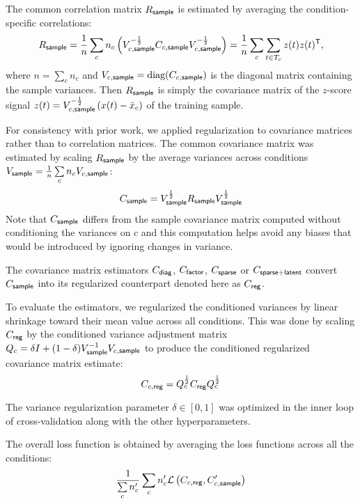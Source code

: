 The common correlation matrix $R_{\sf sample}$ is estimated by averaging the condition-specific correlations:
\begin{equation}
    R_{\sf sample}  
    = \frac 1 n \sum\limits_c n_c \left(V_{c,\sf sample}^{-\frac 1 2}C_{c,\sf sample}V_{c,\sf sample}^{-\frac 1 2}\right)
    = \frac 1 n \sum\limits_c \sum\limits_{t \in T_c} z(t)z(t)^{\sf T},
\end{equation}
where $n=\sum\limits_c n_c$ and $V_{c,\sf sample} = \mbox{diag}(C_{c,\sf sample})$ is the diagonal matrix containing the sample variances. Then $R_{\sf sample}$ is simply the covariance matrix of the $z$-score signal $z(t) = V_{c,\sf sample}^{-\frac 1 2} \left(x(t) - \bar x_c\right)$ of the training sample.

For consistency with prior work, we applied regularization to covariance matrices rather than to correlation matrices. The common covariance matrix was estimated by scaling $R_{\sf sample}$ by the average variances across conditions $V_{\sf sample} = \frac 1 n \sum\limits_c n_c V_{c,\sf sample}$:
\begin{equation}
    C_{\sf sample} = V_{\sf sample}^{\frac 1 2} R_{\sf sample} V_{\sf sample}^{\frac 1 2}
\end{equation}
Note that $C_{\sf sample}$ differs from the sample covariance matrix computed without conditioning the variances on $c$ and this computation helps avoid any biases that would be introduced by ignoring changes in variance.

The covariance matrix estimators $C_{\sf diag}$, $C_{\sf factor}$, $C_{\sf sparse}$ or $C_{\sf sparse+latent}$ convert $C_{\sf sample}$ into its regularized counterpart denoted here as $C_{\sf reg}$.

To evaluate the estimators, we regularized the conditioned variances by linear shrinkage toward their mean value across all conditions. This was done by scaling $C_{\sf reg}$ by the conditioned variance adjustment matrix $Q_c = \delta I + (1-\delta)V_{\sf sample}^{-1} V_{c,\sf sample}$ to produce the conditioned regularized covariance matrix estimate:
\begin{equation}
    C_{c,\sf reg} = Q_c^{\frac 1 2} C_{\sf reg} Q_c^{\frac 1 2}
\end{equation}

The variance regularization parameter $\delta \in [0,1]$ was optimized in the inner loop of cross-validation along with the other hyperparameters.

The overall loss function is obtained by averaging the loss functions across all the conditions:
\begin{equation}\label{eq:full-loss}
    \frac 1 {\sum\limits_c n_c^\prime}\sum\limits_c n_c^\prime \mathcal L\left(C_{c,\sf reg}, C_{c,\sf sample}^\prime\right) 
\end{equation}

